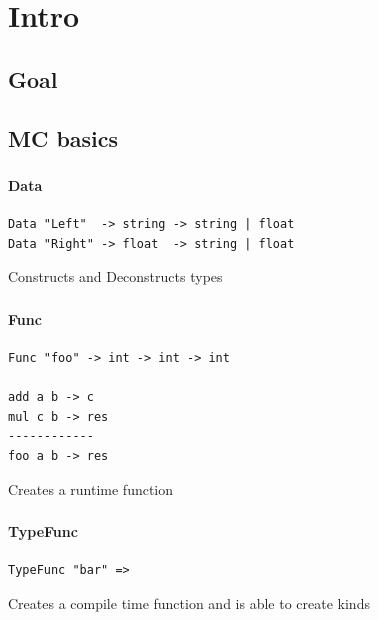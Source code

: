 \section{Intro}
\subsection{Goal}

\subsection{MC basics}

\begin{frame}[fragile]
   \frametitle{\subsecname}
   \framesubtitle{Data}

   \begin{lstlisting}
Data "Left"  -> string -> string | float
Data "Right" -> float  -> string | float
   \end{lstlisting}
   Constructs and Deconstructs types
\end{frame}

\begin{frame}[fragile]
   \frametitle{\subsecname}
   \framesubtitle{Func}

   \begin{lstlisting}
Func "foo" -> int -> int -> int

add a b -> c
mul c b -> res
------------
foo a b -> res
   \end{lstlisting}
   Creates a runtime function
\end{frame}

\begin{frame}[fragile]
   \frametitle{\subsecname}
   \framesubtitle{TypeFunc}

   \begin{lstlisting}
TypeFunc "bar" =>

   \end{lstlisting}
   Creates a compile time function and is able to create kinds
\end{frame}

